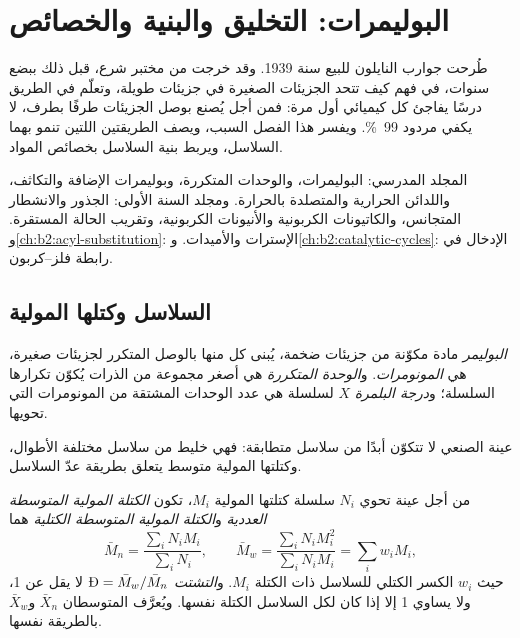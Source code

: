 \chapter{البوليمرات: التخليق والبنية والخصائص}\label{ch:b2:polymer-synthesis}

طُرحت جوارب النايلون للبيع سنة 1939. وقد خرجت من مختبر شرع، قبل ذلك ببضع
سنوات، في فهم كيف تتحد الجزيئات الصغيرة في جزيئات طويلة، وتعلّم في الطريق
درسًا يفاجئ كل كيميائي أول مرة: فمن أجل  يُصنع بوصل الجزيئات طرفًا بطرف،
لا يكفي مردود 99~\%. ويفسر هذا الفصل السبب، ويصف الطريقتين اللتين تنمو بهما السلاسل،
ويربط بنية السلاسل بخصائص المواد.

\begin{recall}
المجلد المدرسي: البوليمرات،  والوحدات المتكررة، وبوليمرات الإضافة والتكاثف،
واللدائن الحرارية والمتصلدة بالحرارة. ومجلد السنة الأولى: الجذور والانشطار المتجانس، والكاتيونات الكربونية 
والأنيونات الكربونية، وتقريب الحالة المستقرة. و\cref{ch:b2:acyl-substitution}: الإسترات والأميدات.
و\cref{ch:b2:catalytic-cycles}: الإدخال في رابطة فلز--كربون.
\end{recall}

\section{السلاسل وكتلها المولية}

\begin{definition}[البوليمر]\label{def:b2:polymer-synthesis:polymer}
\emph{البوليمر} مادة مكوّنة من جزيئات ضخمة، يُبنى كل منها بالوصل المتكرر
لجزيئات صغيرة، هي \emph{المونومرات}. و\emph{الوحدة المتكررة}
هي أصغر مجموعة من الذرات يُكوّن تكرارها السلسلة؛ و\emph{درجة
البلمرة} $X$ لسلسلة هي عدد الوحدات المشتقة من المونومرات
التي تحويها.
\end{definition}

عينة  الصنعي لا تتكوّن أبدًا من سلاسل متطابقة: فهي خليط من سلاسل
مختلفة الأطوال، وكتلتها المولية متوسط يتعلق بطريقة عدّ السلاسل.

\begin{definition}\label{def:b2:polymer-synthesis:averages}
من أجل عينة تحوي $N_i$ سلسلة كتلتها المولية $M_i$، تكون \emph{الكتلة المولية المتوسطة
العددية} و\emph{الكتلة المولية المتوسطة الكتلية}
هما
\begin{equation*}
\bar M_n = \frac{\sum_i N_i M_i}{\sum_i N_i}, \qquad
\bar M_w = \frac{\sum_i N_i M_i^2}{\sum_i N_i M_i} = \sum_i w_i M_i,
\end{equation*}
حيث $w_i$ الكسر الكتلي للسلاسل ذات الكتلة $M_i$. و\emph{التشتت}
$\text{\DH} = \bar M_w/\bar M_n$ لا يقل عن 1، ولا يساوي 1 إلا إذا كان لكل السلاسل
الكتلة نفسها. ويُعرَّف المتوسطان $\bar X_n$ و$\bar X_w$  بالطريقة
نفسها.
\end{definition}

